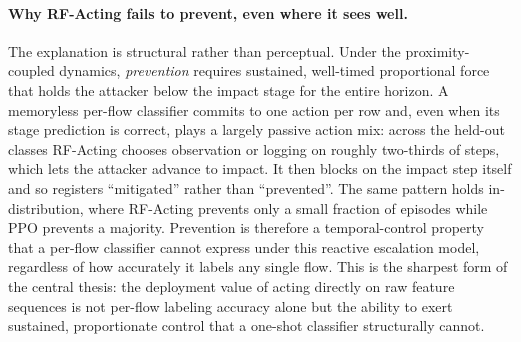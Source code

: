 \paragraph{Why RF-Acting fails to prevent, even where it sees well.} The explanation is structural rather than perceptual. Under the proximity-coupled dynamics, \emph{prevention} requires sustained, well-timed proportional force that holds the attacker below the impact stage for the entire horizon. A memoryless per-flow classifier commits to one action per row and, even when its stage prediction is correct, plays a largely passive action mix: across the held-out classes RF-Acting chooses observation or logging on roughly two-thirds of steps, which lets the attacker advance to impact. It then blocks on the impact step itself and so registers ``mitigated'' rather than ``prevented''. The same pattern holds in-distribution, where RF-Acting prevents only a small fraction of episodes while PPO prevents a majority. Prevention is therefore a temporal-control property that a per-flow classifier cannot express under this reactive escalation model, regardless of how accurately it labels any single flow. This is the sharpest form of the central thesis: the deployment value of acting directly on raw feature sequences is not per-flow labeling accuracy alone but the ability to exert sustained, proportionate control that a one-shot classifier structurally cannot.

\clearpage
